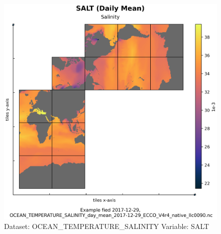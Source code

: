\begin{figure}[H]
\centering
\includegraphics[scale=0.55]{../images/plots/native_plots/Ocean_Temperature_and_Salinity/SALT.png}
\caption{Dataset: OCEAN\_TEMPERATURE\_SALINITY Variable: SALT}
\label{tab:table-OCEAN_TEMPERATURE_SALINITY_SALT-Plot}
\end{figure}
\pagebreak
